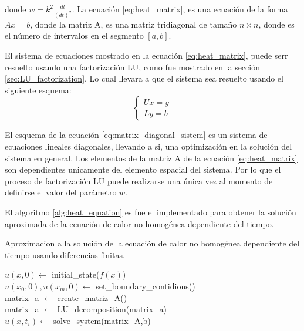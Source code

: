 donde $w=k^2\frac{dt}{(dt)^2}$. La ecuación \ref{eq:heat_matrix}, es una ecuación de la forma $Ax=b$, donde la matriz A, es una matriz tridiagonal de tamaño $n \times n$, donde  es el número de intervalos en el segmento $[a,b]$.

El sistema de ecuaciones mostrado en la ecuación \ref{eq:heat_matrix}, puede serr resuelto usando una factorización LU, como fue mostrado en la sección \ref{sec:LU_factorization}. Lo cual llevara a que el sistema sea resuelto usando el siguiente esquema:
\begin{equation}
    \begin{cases}
        Ux=y \\
        Ly=b
    \end{cases} \label{eq:matrix_diagonal_sistem}
\end{equation}

El esquema de la ecuación \ref{eq:matrix_diagonal_sistem} es un sistema de ecuaciones lineales diagonales, llevando a si, una optimización en la solución del sistema en general. Los elementos de la matriz A de la ecuación \ref{eq:heat_matrix} son dependientes unicamente del elemento espacial del sistema. Por lo que el proceso de factorización LU puede realizarse una única vez al momento de definirse el valor del parámetro $w$.

El algoritmo \ref{alg:heat_equation} es fue el implementado para obtener la solución aproximada de la ecuación de calor no homogénea dependiente del tiempo.

\begin{algorithm}[H]
    \caption{Aproximacion a la solución de la ecuación de calor no homogénea dependiente del tiempo usando diferencias finitas.}
    \label{alg:heat_equation}
    $u(x,0) \gets$ initial\_state($f(x)$) \\
    $u(x_0,0),u(x_m,0) \gets$ set\_boundary\_contidions()\\
    matrix\_a $\gets$ create\_matriz\_A()\\
    matrix\_a $\gets$ LU\_decomposition(matrix\_a)\\
    {
    $u(x,t_i) \gets$ solve\_system(matrix\_A,b)
    }
\end{algorithm}